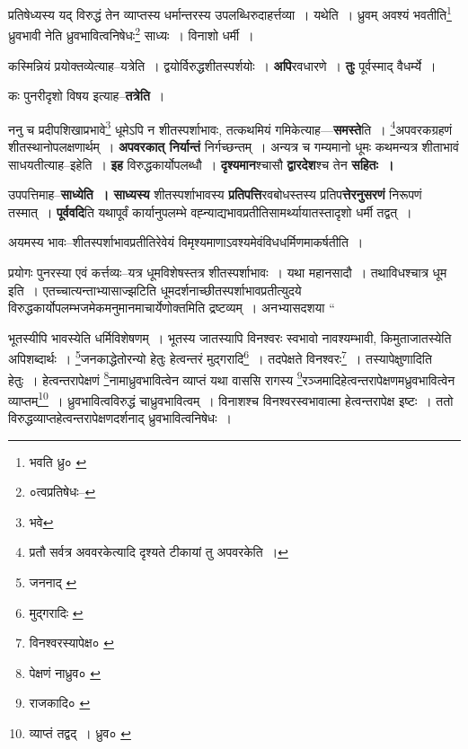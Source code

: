 \documentclass[article,12pt,a4paper]{memoir}
\begin{document}
	  \endgroup
	 

	  \pstart प्रतिषेध्यस्य यद् विरुद्धं तेन व्याप्तस्य धर्मान्तरस्य उपलब्धिरुदाहर्त्तव्या । यथेति । ध्रुवम् अवश्यं भवतीति\footnote{भवति ध्रु० \cite{dp-msB} \cite{dp-msC} \cite{dp-msD}} ध्रुवभावी नेति ध्रुवभावित्वनिषेधः\footnote{०त्वप्रतिषेधः--\cite{dp-msC}} साध्यः । विनाशो धर्मी ।
	\pend
      
	  \endgroup
	

	  \pstart कस्मिन्नियं प्रयोक्तव्येत्याह--यत्रेति । द्वयोर्विरुद्धशीतस्पर्शयोः । \textbf{अपि}रवधारणे । \textbf{तुः} पूर्वस्माद् वैधर्म्ये ।
	\pend
      

	  \pstart कः पुनरीदृशो विषय इत्याह--\textbf{तत्रेति} ।
	\pend
      

	  \pstart ननु च प्रदीपशिखाप्रभावे\footnote{भवे} धूमेऽपि न शीतस्पर्शाभावः, तत्कथमियं गमिकेत्याह—\textbf{समस्ते}ति । \footnote{प्रतौ सर्वत्र अववरकेत्यादि दृश्यते टीकायां तु अपवरकेति ।}\-अपवरकग्रहणं शीतस्थानोपलक्षणार्थम् । \textbf{अपवरकात् निर्यान्तं} निर्गच्छन्तम् । अन्यत्र च गम्यमानो धूमः कथमन्यत्र शीताभावं साधयतीत्याह--इहेति । \textbf{इह} विरुद्धकार्योपलब्धौ । \textbf{दृश्यमान}श्चासौ \textbf{द्वारदेश}श्च तेन \textbf{सहितः ।}
	\pend
      

	  \pstart उपपत्तिमाह--\textbf{साध्येति । साध्यस्य} शीतस्पर्शाभावस्य \textbf{प्रतिपत्ति}रवबोधस्तस्य प्रतिप\textbf{त्तेरनुसरणं} निरूपणं तस्मात् । \textbf{पूर्ववदि}ति यथापूर्वं कार्यानुपलम्भे वह्न्याद्यभावप्रतीतिसामर्थ्यायातस्तादृशो धर्मी तद्वत् ।
	\pend
      

	  \pstart अयमस्य भावः--शीतस्पर्शाभावप्रतीतिरेवेयं विमृश्यमाणाऽवश्यमेवंविधधर्मिणमाकर्षतीति ।
	\pend
      

	  \pstart प्रयोगः पुनरस्या एवं कर्त्तव्यः--यत्र धूमविशेषस्तत्र शीतस्पर्शाभावः । यथा महानसादौ । तथाविधश्चात्र धूम इति । एतच्चात्यन्ताभ्यासाज्झटिति धूमदर्शनाच्छीतस्पर्शाभावप्रतीत्युदये विरुद्धकार्योपलम्भजमेकमनुमानमाचार्येणोक्तमिति द्रष्टव्यम् । अनभ्यासदशया  \leavevmode{} “
	  
	भूतस्यीपि भावस्येति धर्मिविशेषणम् । भूतस्य जातस्यापि विनश्वरः स्वभावो नावश्यम्भावी, किमुताजातस्येति अपिशब्दार्थः । \footnote{जननाद् \cite{dp-msA} \cite{dp-edP} \cite{dp-edH} \cite{dp-edE}}\-जनकाद्धेतोरन्यो हेतुः हेत्वन्तरं मुद्गरादि\footnote{मुद्गरादिः \cite{dp-msC}} । तदपेक्षते विनश्वरः\footnote{विनश्वरस्यापेक्ष० \cite{dp-msA}} । तस्यापेक्षुणादिति हेतुः । हेत्वन्तरापेक्षणं \footnote{पेक्षणं नाध्रुव० \cite{dp-msB}}\-नामाध्रुवभावित्वेन व्याप्तं यथा वाससि रागस्य \footnote{राजकादि० \cite{dp-msB} \cite{dp-msC} \cite{dp-msD}}\-रञ्जमादिहेत्वन्तरापेक्षणमध्रुवभावित्वेन व्याप्तम्\footnote{व्याप्तं तद्वद् । ध्रुव० \cite{dp-msC}} । ध्रुवभावित्वविरुद्धं चाध्रुवभावित्वम् । विनाशश्च विनश्वरस्वभावात्मा हेत्वन्तरापेक्ष इष्टः । ततो विरुद्धव्याप्तहेत्वन्तरापेक्षणदर्शनाद् ध्रुवभावित्वनिषेधः । 
	  
\end{document}
